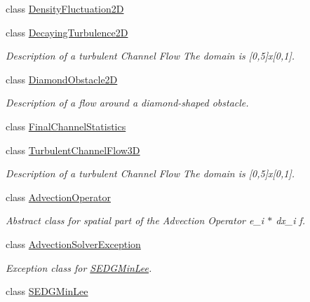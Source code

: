 \begin{DoxyCompactItemize}
class \hyperlink{classnatrium_1_1DensityFluctuation2D}{DensityFluctuation2D}
\item 
class \hyperlink{classnatrium_1_1DecayingTurbulence2D}{DecayingTurbulence2D}
\begin{DoxyCompactList}\small\item\em Description of a turbulent Channel Flow The domain is \mbox{[}0,5\mbox{]}x\mbox{[}0,1\mbox{]}. \item\end{DoxyCompactList}\item 
class \hyperlink{classnatrium_1_1DiamondObstacle2D}{DiamondObstacle2D}
\begin{DoxyCompactList}\small\item\em Description of a flow around a diamond-\/shaped obstacle. \item\end{DoxyCompactList}\item 
class \hyperlink{classnatrium_1_1FinalChannelStatistics}{FinalChannelStatistics}
\item 
class \hyperlink{classnatrium_1_1TurbulentChannelFlow3D}{TurbulentChannelFlow3D}
\begin{DoxyCompactList}\small\item\em Description of a turbulent Channel Flow The domain is \mbox{[}0,5\mbox{]}x\mbox{[}0,1\mbox{]}. \item\end{DoxyCompactList}\item 
class \hyperlink{classnatrium_1_1AdvectionOperator}{AdvectionOperator}
\begin{DoxyCompactList}\small\item\em Abstract class for spatial part of the Advection Operator e\_\-i $\ast$ dx\_\-i f. \item\end{DoxyCompactList}\item 
class \hyperlink{classnatrium_1_1AdvectionSolverException}{AdvectionSolverException}
\begin{DoxyCompactList}\small\item\em Exception class for \hyperlink{classnatrium_1_1SEDGMinLee}{SEDGMinLee}. \item\end{DoxyCompactList}\item 
class \hyperlink{classnatrium_1_1SEDGMinLee}{SEDGMinLee}

\end{DoxyCompactItemize}
